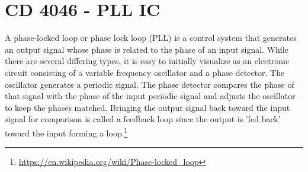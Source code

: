 \section{CD 4046 - PLL IC}

A phase-locked loop or phase lock loop (PLL) is a control system that generates an output signal whose phase is related to the phase of an input signal. While there are several differing types, it is easy to initially visualize as an electronic circuit consisting of a variable frequency oscillator and a phase detector. The oscillator generates a periodic signal. The phase detector compares the phase of that signal with the phase of the input periodic signal and adjusts the oscillator to keep the phases matched. Bringing the output signal back toward the input signal for comparison is called a feedback loop since the output is 'fed back' toward the input forming a loop.\footnote{\url{https://en.wikipedia.org/wiki/Phase-locked_loop}}
